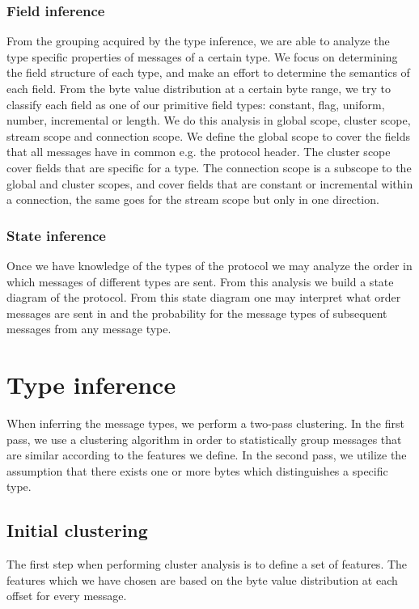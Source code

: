 \documentclass[a4paper]{report}
\begin{document}
\subsubsection{Field inference}
From the grouping acquired by the type inference, we are able to analyze the
type specific properties of messages of a certain type. We focus on
determining the field structure of each type, and make an effort to determine
the semantics of each field. From the byte value distribution at a certain byte
range, we try to classify each field as one of our primitive field types: 
constant, flag, uniform, number, incremental or length. We do this analysis in
global scope, cluster scope, stream scope and connection scope. We define the
global scope to cover the fields that all messages have in common e.g. the
protocol header. The cluster scope cover fields that are specific for a type.
The connection scope is a subscope to the global and cluster scopes, and cover
fields that are constant or incremental within a connection, the same goes for
the stream scope but only in one direction.

\subsubsection{State inference}
Once we have knowledge of the types of the protocol we may analyze the order
in which messages of different types are sent. From this analysis we build
a state diagram of the protocol. From this state diagram one may interpret
what order messages are sent in and the probability for the message types
of subsequent messages from any message type.

\section{Type inference}
\label{sec:type_inf}
When inferring the message types, we perform a two-pass clustering. In the
first pass, we use a clustering algorithm in order to statistically group
messages that are similar according to the features we define. In the second
pass, we utilize the assumption that there exists one or more bytes which
distinguishes a specific type.

\subsection{Initial clustering}
\label{sec:init_clust}
The first step when performing cluster analysis is to define a set of features.
The features which we have chosen are based on the byte value distribution at
each offset for every message.
\end{document}
